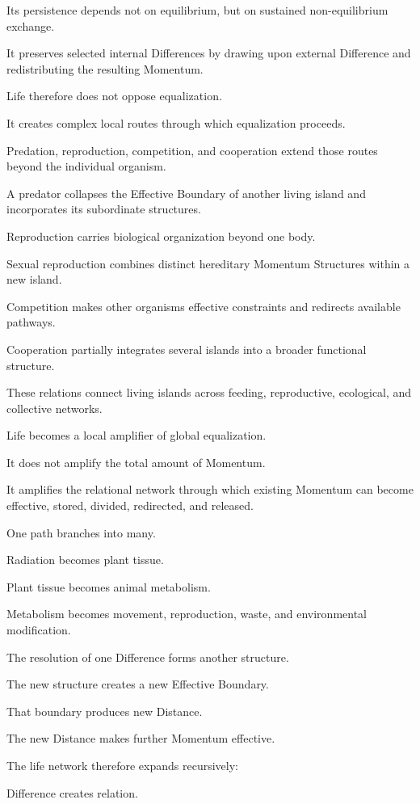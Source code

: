 Its persistence depends not on equilibrium, but on sustained non-equilibrium exchange.

It preserves selected internal Differences by drawing upon external Difference and redistributing the resulting Momentum.

Life therefore does not oppose equalization.

It creates complex local routes through which equalization proceeds.

Predation, reproduction, competition, and cooperation extend those routes beyond the individual organism.

A predator collapses the Effective Boundary of another living island and incorporates its subordinate structures.

Reproduction carries biological organization beyond one body.

Sexual reproduction combines distinct hereditary Momentum Structures within a new island.

Competition makes other organisms effective constraints and redirects available pathways.

Cooperation partially integrates several islands into a broader functional structure.

These relations connect living islands across feeding, reproductive, ecological, and collective networks.

Life becomes a local amplifier of global equalization.

It does not amplify the total amount of Momentum.

It amplifies the relational network through which existing Momentum can become effective, stored, divided, redirected, and released.

One path branches into many.

Radiation becomes plant tissue.

Plant tissue becomes animal metabolism.

Metabolism becomes movement, reproduction, waste, and environmental modification.

The resolution of one Difference forms another structure.

The new structure creates a new Effective Boundary.

That boundary produces new Distance.

The new Distance makes further Momentum effective.

The life network therefore expands recursively:

Difference creates relation.


